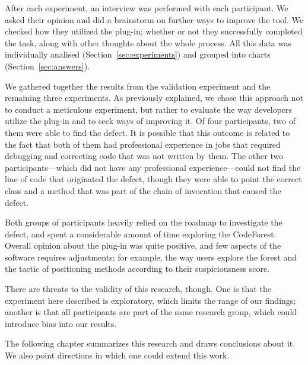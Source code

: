 After each experiment, an interview was performed with each participant. We
asked their opinion and did a brainstorm on further ways to improve the tool. We
checked how they utilized the plug-in; whether or not they successfully
completed the task, along with other thoughts about the whole process. All this
data was individually analised (Section~\ref{sec:experiments}) and grouped into
charts (Section~\ref{sec:answers}).

We gathered together the results from the validation experiment and the
remaining three experiments. As previously explained, we chose this approach not
to conduct a meticulous experiment, but rather to evaluate the way developers
utilize the plug-in and to seek ways of improving it. Of four participants, two
of them were able to find the defect.
It is possible that this outcome is related to the fact that both of them had
professional experience in jobs that required debugging and correcting code that
was not written by them. The other two participants---which did not have any
professional experience---could not find the line of code that originated the
defect, though they were able to point the correct class and a method that was
part of the chain of invocation that caused the defect.

Both groups of participants heavily relied on the roadmap to investigate the
defect, and spent a considerable amount of time exploring the CodeForest.
Overall opinion about the plug-in was quite positive, and few aspects of the
software requires adjustments; for example, the way users explore the forest
and the tactic of positioning methods according to their suspiciousness score.

There are threats to the validity of this research, though. One is that the
experiment here described is exploratory, which limits the range of our
findings; another is that all participants are part of the same research group,
which could introduce bias into our results.

The following chapter summarizes this research and draws conclusions about it.
We also point directions in which one could extend this work.